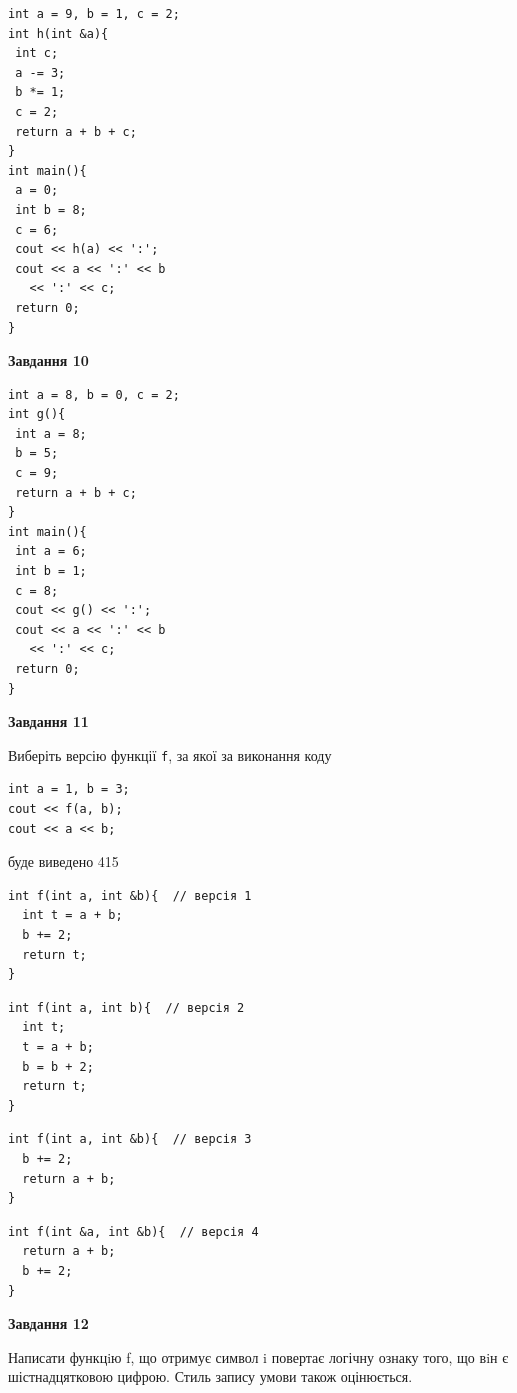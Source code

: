 \documentclass[12pt, ukrainian]{article}
\def\code#1{\Verb!#1!}
\begin{document}
{\begin {large}
\begin{minipage}[t]{7.0cm}
\begin{verbatim}
int a = 9, b = 1, c = 2;
int h(int &a){
 int c;
 a -= 3;
 b *= 1;
 c = 2;
 return a + b + c;
}
int main(){
 a = 0;
 int b = 8;
 c = 6;
 cout << h(a) << ':';
 cout << a << ':' << b 
   << ':' << c;
 return 0;
}
\end{verbatim}



\begin{center}
\textbf{Завдання 10}
\end{center}
\vspace{-8mm}

\begin{verbatim}
int a = 8, b = 0, c = 2;
int g(){
 int a = 8;
 b = 5;
 c = 9;
 return a + b + c;
}
int main(){
 int a = 6;
 int b = 1;
 c = 8;
 cout << g() << ':';
 cout << a << ':' << b 
   << ':' << c;
 return 0;
}
\end{verbatim}

\end{minipage}
\vline \hspace{1mm}
\begin{minipage}[t]{11.0cm}

\begin{center}
\textbf{Завдання 11}
\end{center}
Виберіть версію функції \code{f}, за якої за виконання коду
\begin{verbatim}
int a = 1, b = 3;
cout << f(a, b);
cout << a << b;
\end{verbatim}

буде виведено 415

\begin{verbatim}
int f(int a, int &b){  // версія 1
  int t = a + b;
  b += 2;
  return t;
}
\end{verbatim}

\vspace{-8mm}\begin{verbatim}
int f(int a, int b){  // версія 2
  int t;
  t = a + b;
  b = b + 2;
  return t;
}
\end{verbatim}

\vspace{-8mm}\begin{verbatim}
int f(int a, int &b){  // версія 3
  b += 2;
  return a + b;
}
\end{verbatim}

\vspace{-8mm}\begin{verbatim}
int f(int &a, int &b){  // версія 4
  return a + b;
  b += 2;
}
\end{verbatim}



\begin{center}
\textbf{Завдання 12}
\end{center}

Написати функцiю f, що отримує символ i повертає логічну ознаку того, що вiн є шістнадцятковою цифрою. Стиль запису умови також оцінюється.\par

\end{minipage}

\end {large}}
\newpage
\end{document}
